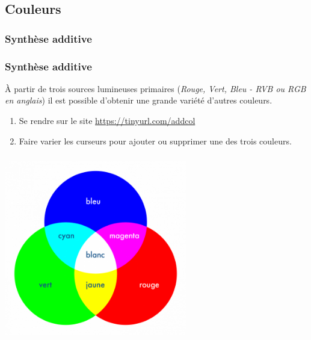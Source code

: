 \documentclass[svgnames,11pt]{beamer}
\begin{document}
\subsection{Couleurs}
\subsubsection{Synthèse additive}
\begin{frame}
    \frametitle{Synthèse additive}
    \begin{aretenir}[]
        À partir de trois sources lumineuses primaires (\emph{Rouge, Vert, Bleu - RVB ou RGB en anglais}) il est possible d'obtenir une grande variété d'autres couleurs.
    \end{aretenir}

    \begin{activite}
        \begin{enumerate}
            \item Se rendre sur le site \url{https://tinyurl.com/addcol}
            \item Faire varier les curseurs pour ajouter ou supprimer une des trois couleurs.
        \end{enumerate}
    \end{activite}
\end{frame}
\begin{frame}
    \frametitle{}

    \begin{center}
        \centering
        \includegraphics[width=8cm]{ressources/synthese-add.png}
        \label{IMG}
    \end{center}

\end{frame}
\end{document}
